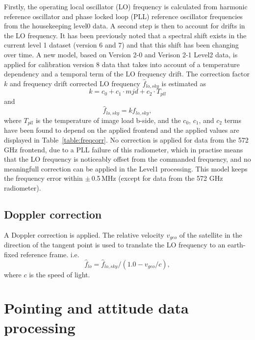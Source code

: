 Firstly, the operating local oscillator (LO) frequency is calculated
from harmonic reference oscillator and phase locked loop (PLL) 
reference oscillator frequencies from the housekeeping level0 data.
A second step is then to account for drifts in the LO frequency.
It has been previously noted that a spectral shift exists in 
the current level 1 dataset (version 6 and 7) and that this shift 
has been changing over time.
A new model, based on Version 2-0 and Verison 2-1 Level2 data,
is applied for calibration version 8 data that takes into
account of a temperature dependency and a temporal term
of the LO frequency drift.
The correction factor \(k\) and frequency drift corrected
LO frequency \(\hat{f}_{lo,sky}\) is estimated as
\begin{equation}
  \label{eq:freqcorr}
  k = c_{0} + c_{1} \cdot mjd + c_{2} \cdot T_{pll}
\end{equation}
and
\begin{equation}
 \label{eq:freqest}
 \hat{f}_{lo,sky}= k f_{lo,sky},
\end{equation}
where \(T_{pll}\) is the temperature of image load b-side,
and the \(c_{0}\), \(c_{1}\), and \(c_{2}\) terms have been found
to depend on the applied frontend and the applied values are
displayed in Table~\ref{table:freqcorr}. No correction
is applied for data from the 572 GHz frontend, due to a PLL
failure of this radiometer, which in practise means
that the LO frequency is noticeably offset from the commanded 
frequency, and no meaningfull correction can be applied
in the Level1 processing.  
This model keeps the frequency error within \(\pm\)\,0.5\,MHz
(except for data from the 572 GHz radiometer).

\subsection{Doppler correction}

A Doppler correction is applied.
The relative velocity \(v_{geo}\) of the satellite in the direction
of the tangent point is used to translate the LO frequency to an 
earth-fixed reference frame. i.e.
\begin{equation}
\hat{f}_{lo} = \hat{f}_{lo,sky}/(1.0 - v_{geo}/c),
\end{equation}
where \(c\) is the speed of light.

\section{Pointing and attitude data processing}

